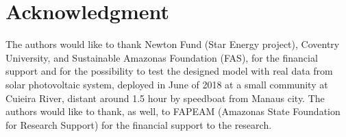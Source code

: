 \documentclass[journal]{IEEEtran}
\begin{document}
%





\section*{Acknowledgment}
The authors would like to thank Newton Fund (Star Energy project), Coventry University, and Sustainable Amazonas Foundation (FAS), for the financial support and for the possibility to test the designed model with real data from solar photovoltaic system, deployed in June of 2018 at a small community at Cuieira River, distant around 1.5 hour by speedboat from Manaus city. The authors would like to thank, as well, to FAPEAM (Amazonas State Foundation for Research Support) for the financial support to the research.





\end{document}
